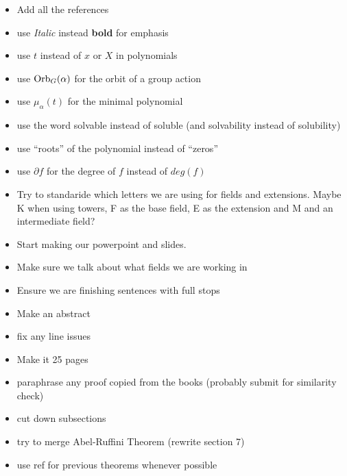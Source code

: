 \begin{itemize}
    \item Add all the references
    \item use \textit{Italic} instead \textbf{bold} for emphasis
    \item use $t$ instead of $x$ or $X$ in polynomials
    \item use $\operatorname{Orb}_G(\alpha)$ for the orbit of a group action
    \item use $\mu_{\alpha}(t)$ for the minimal polynomial
    \item use the word solvable instead of soluble (and solvability instead of solubility)
    \item use ``roots'' of the polynomial instead of ``zeros''
    \item use $\partial f$ for the degree of $f$ instead of $deg(f)$
    \item Try to standaride which letters we are using for fields and extensions. Maybe K when using towers, F as the base field, E as the extension and M and an intermediate field?
    \item Start making our powerpoint and slides.
    \item Make sure we talk about what fields we are working in
    \item Ensure we are finishing sentences with full stops
    \item Make an abstract
    \item fix any line issues
    \item Make it 25 pages
    \item paraphrase any proof copied from the books (probably submit for similarity check)
    \item cut down subsections
    \item try to merge Abel-Ruffini Theorem (rewrite section 7)
    \item use ref for previous theorems whenever possible
\end{itemize}
